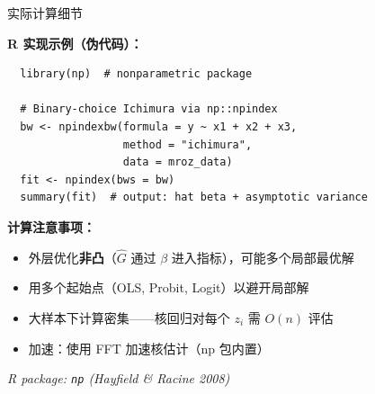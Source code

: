 \documentclass[aspectratio=169, 10pt]{beamer}
\begin{document}
\begin{frame}[fragile]{实际计算细节}

  \textbf{R 实现示例（伪代码）：}

  \footnotesize
  \begin{verbatim}
  library(np)  # nonparametric package

  # Binary-choice Ichimura via np::npindex
  bw <- npindexbw(formula = y ~ x1 + x2 + x3,
                  method = "ichimura",
                  data = mroz_data)
  fit <- npindex(bws = bw)
  summary(fit)  # output: hat beta + asymptotic variance
  \end{verbatim}
  \normalsize

  \begin{keybox}
    \textbf{计算注意事项：}
    \begin{itemize}\setlength{\itemsep}{1pt}
      \item 外层优化\textbf{非凸}（$\hat G$ 通过 $\beta$ 进入指标），可能多个局部最优解
      \item 用多个起始点（OLS, Probit, Logit）以避开局部解
      \item 大样本下计算密集——核回归对每个 $z_i$ 需 $O(n)$ 评估
      \item 加速：使用 FFT 加速核估计（np 包内置）
    \end{itemize}
  \end{keybox}

  \hfill{\scriptsize\textit{R package: \texttt{np} (Hayfield \& Racine 2008)}}

\end{frame}
\end{document}
